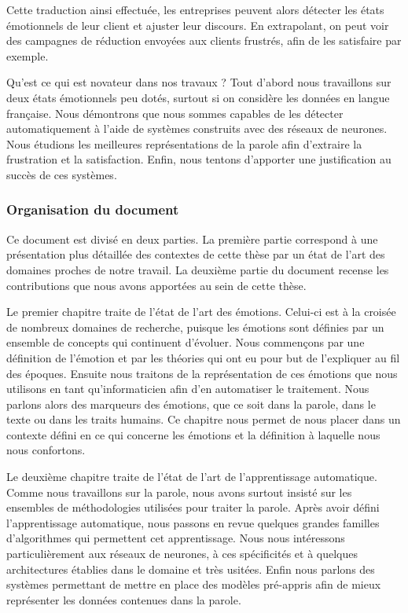Cette traduction ainsi effectuée, les entreprises peuvent alors détecter les états émotionnels de leur client et ajuster leur discours. En extrapolant, on peut voir des campagnes de réduction envoyées aux clients frustrés, afin de les satisfaire par exemple.

Qu'est ce qui est novateur dans nos travaux ? Tout d'abord nous travaillons sur deux états émotionnels peu dotés, surtout si on considère les données en langue française. Nous démontrons que nous sommes capables de les détecter automatiquement à l'aide de systèmes construits avec des réseaux de neurones. Nous étudions les meilleures représentations de la parole afin d'extraire la frustration et la satisfaction. Enfin, nous tentons d'apporter une justification au succès de ces systèmes.

\subsubsection{Organisation du document}

Ce document est divisé en deux parties. La première partie correspond à une présentation plus détaillée des contextes de cette thèse par un état de l'art des domaines proches de notre travail. La deuxième partie du document recense les contributions que nous avons apportées au sein de cette thèse.

Le premier chapitre traite de l'état de l'art des émotions. Celui-ci est à la croisée de nombreux domaines de recherche, puisque les émotions sont définies par un ensemble de concepts qui continuent d'évoluer. Nous commençons par une définition de l'émotion et par les théories qui ont eu pour but de l'expliquer au fil des époques. Ensuite nous traitons de la représentation de ces émotions que nous utilisons en tant qu'informaticien afin d'en automatiser le traitement. Nous parlons alors des marqueurs des émotions, que ce soit dans la parole, dans le texte ou dans les traits humains. Ce chapitre nous permet de nous placer dans un contexte défini en ce qui concerne les émotions et la définition à laquelle nous nous confortons.

Le deuxième chapitre traite de l'état de l'art de l'apprentissage automatique. Comme nous travaillons sur la parole, nous avons surtout insisté sur les ensembles de méthodologies utilisées pour traiter la parole. Après avoir défini l'apprentissage automatique, nous passons en revue quelques grandes familles d'algorithmes qui permettent cet apprentissage. Nous nous intéressons particulièrement aux réseaux de neurones, à ces spécificités et à quelques architectures établies dans le domaine et très usitées. Enfin nous parlons des systèmes permettant de mettre en place des modèles pré-appris afin de mieux représenter les données contenues dans la parole.

